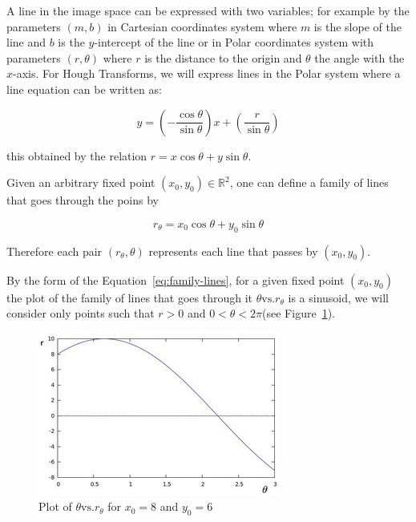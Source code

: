 \bigskip

A line in the image space can be expressed with two variables; for example by the parameters $(m,b)$ in Cartesian coordinates system where $m$ is the slope of the line and $b$ is the $y$-intercept of the line or in Polar coordinates system with parameters $(r,\theta)$ where $r$ is the distance to the origin and $\theta$ the angle with the $x$-axis. For Hough Transforms, we will express lines in the Polar system where a line equation can be written as:

\begin{equation}
\label{eq:polar-lines}
y = \left(-\frac{\cos\theta}{\sin\theta}\right)x+\left(\frac{r}{\sin\theta}\right)
\end{equation} 

this obtained by the relation $r=x\cos\theta+y\sin\theta$.

\bigskip

Given an arbitrary fixed point $(x_0,y_0)\in\mathbb{R}^2$, one can define a family of lines that goes through the poins by

\begin{equation}
\label{eq:family-lines}
r_{\theta}=x_0\cos\theta+y_0\sin\theta
\end{equation}

Therefore each pair $(r_{\theta},\theta)$ represents each line that passes by $(x_0,y_0)$.

\bigskip 

By the form of the Equation~\ref{eq:family-lines}, for a given fixed point $(x_0,y_0)$ the plot of the family of lines that goes through it $\theta\textrm{vs.}r_{\theta}$ is a sinusoid, we will consider only points such that $r>0$ and $0<\theta<2\pi$(see Figure~\ref{fig:family-lines-hough}).

\begin{figure}[h!]
\centering
\includegraphics[width = 0.8 \textwidth]{./Diagrams/family-lines-hough.jpg}
\caption{Plot of $\theta\textrm{vs.}r_{\theta}$ for $x_0=8$ and $y_0=6$}
\label{fig:family-lines-hough}
\end{figure}

